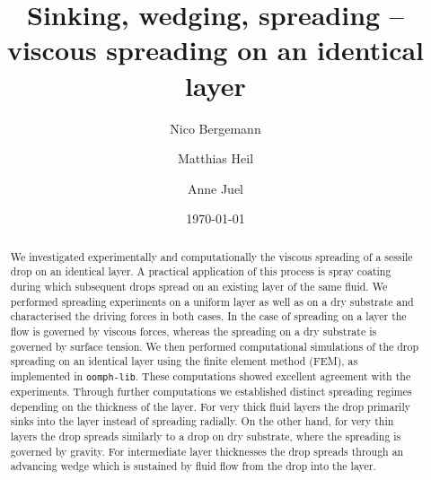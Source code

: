 \documentclass[aip,graphicx]{revtex4-1}
\begin{document}

\title{Sinking, wedging, spreading -- viscous spreading on an identical layer}



\author{Nico Bergemann}
\author{Matthias Heil}
\author{Anne Juel}


\date{\today}

\begin{abstract}
 We investigated experimentally and computationally the viscous spreading of a sessile drop on an identical layer.
 A practical application of this process is spray coating during which subsequent drops spread on an existing layer of the same fluid.
 We performed spreading experiments on a uniform layer as well as on a dry substrate and characterised the driving forces in both cases.
 In the case of spreading on a layer the flow is governed by viscous forces, whereas the spreading on a dry substrate is governed by surface tension.
 We then performed computational simulations of the drop spreading on an identical layer using the finite element method (FEM), as implemented in \texttt{oomph-lib}.
 These computations showed excellent agreement with the experiments.
 Through further computations we established distinct spreading regimes depending on the thickness of the layer.
 For very thick fluid layers the drop primarily sinks into the layer instead of spreading radially.
 On the other hand, for very thin layers the drop spreads similarly to a drop on dry substrate, where the spreading is governed by gravity.
 For intermediate layer thicknesses the drop spreads through an advancing wedge which is sustained by fluid flow from the drop into the layer.
\end{abstract}
\end{document}

